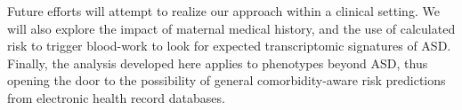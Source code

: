 \documentclass[3p,super,numbers,sort&compress,preprint,10pt]{elsarticle}
\begin{document}
 Future efforts will attempt to realize our approach within a clinical setting. We will also explore the impact of  maternal medical history, and the  use of calculated risk to trigger   blood-work to look for expected  transcriptomic  signatures of ASD.
Finally,  the analysis developed here applies to phenotypes beyond ASD, thus opening the door to the possibility of  general  comorbidity-aware risk predictions  from electronic health record databases.
 


\def\MXCOL{black}
\def\FXCOL{Orchid3}
\def\MNCOL{SeaGreen4}
\def\FNCOL{SeaGreen4}
\def\NCOL{SeaGreen4}
\def\XCOL{Tomato}
\def\WCOL{Tomato}
\def\YCOL{DodgerBlue4}
\def\TEXTCOL{gray}
\def\AXISCOL{white}
\end{document}
